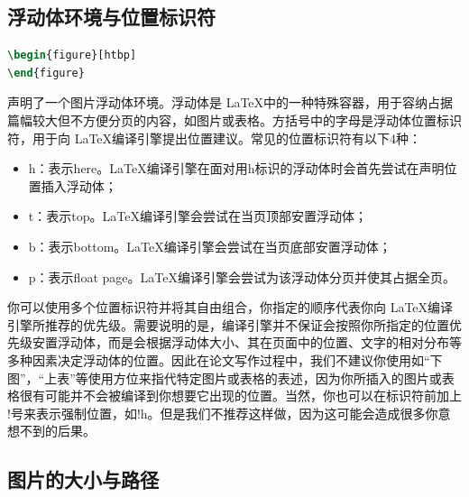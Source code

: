 \subsection{浮动体环境与位置标识符}

\begin{tcolorbox}
\begin{lstlisting}[language=TeX]
\begin{figure}[htbp]
\end{figure}
\end{lstlisting}
\end{tcolorbox}

\noindent 声明了一个图片浮动体环境。浮动体是 \LaTeX 中的一种特殊容器，用于容纳占据篇幅较大但不方便分页的内容，如图片或表格。方括号中的字母是浮动体位置标识符，用于向 \LaTeX 编译引擎提出位置建议。常见的位置标识符有以下4种：

\begin{itemize}
  \setlength{\itemsep}{1.5pt}
  \setlength{\parsep}{1.5pt}
  \setlength{\parskip}{1.5pt}
  \item {\codefont h}：表示here。\LaTeX 编译引擎在面对用{\codefont h}标识的浮动体时会首先尝试在声明位置插入浮动体；
  \item {\codefont t}：表示top。\LaTeX 编译引擎会尝试在当页顶部安置浮动体；
  \item {\codefont b}：表示bottom。\LaTeX 编译引擎会尝试在当页底部安置浮动体；
  \item {\codefont p}：表示float page。\LaTeX 编译引擎会尝试为该浮动体分页并使其占据全页。
\end{itemize}
你可以使用多个位置标识符并将其自由组合，你指定的顺序代表你向 \LaTeX 编译引擎所推荐的优先级。需要说明的是，编译引擎并不保证会按照你所指定的位置优先级安置浮动体，而是会根据浮动体大小、其在页面中的位置、文字的相对分布等多种因素决定浮动体的位置。因此在论文写作过程中，我们不建议你使用如“下图”，“上表”等使用方位来指代特定图片或表格的表述，因为你所插入的图片或表格很有可能并不会被编译到你想要它出现的位置。当然，你也可以在标识符前加上 !号来表示强制位置，如{\codefont !h}。但是我们不推荐这样做，因为这可能会造成很多你意想不到的后果。

\subsection{图片的大小与路径}

